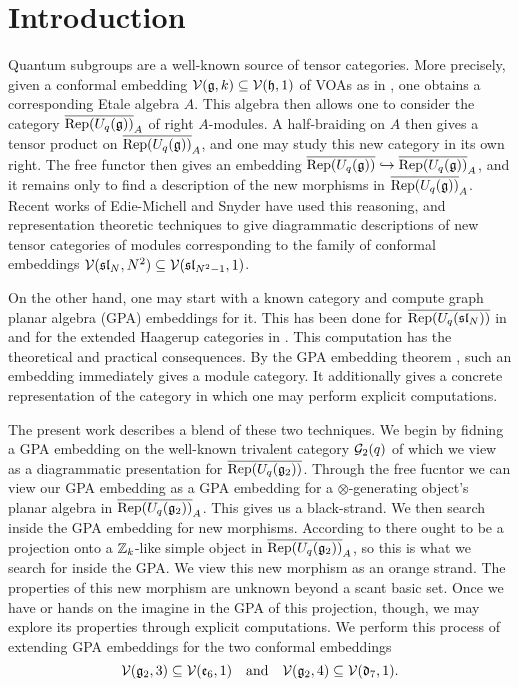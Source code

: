 \section{Introduction}
Quantum subgroups are a well-known source of tensor categories.
More precisely, given a conformal embedding $\mathcal{V}(\mathfrak{g},k) \subseteq \mathcal{V}(\mathfrak{h},1)$ of VOAs 
as in \cite{DMNO}, one obtains a corresponding Etale algebra $A$.
This algebra then allows one to consider the category $\overline{\operatorname{Rep}(U_q(\mathfrak{g}))}_A$ of right $A$-modules.
A half-braiding on $A$ then gives a tensor product on $\overline{\operatorname{Rep}(U_q(\mathfrak{g}))}_A$, and one may study this
new category in its own right.
The free functor then gives an embedding $\overline{\operatorname{Rep}(U_q(\mathfrak{g}))} \hookrightarrow \overline{\operatorname{Rep}(U_q(\mathfrak{g}))}_A$,
and it remains only to find a description of the new morphisms in $\overline{\operatorname{Rep}(U_q(\mathfrak{g}))}_A$.
Recent works of Edie-Michell and Snyder \cite{cain_noah} have used this reasoning, and 
representation theoretic techniques to give diagrammatic descriptions of new tensor categories of modules
corresponding to the family of conformal embeddings $\mathcal{V}(\mathfrak{sl}_N,N^2) \subseteq \mathcal{V}(\mathfrak{sl}_{N^2-1},1)$.

On the other hand, one may start with a known category and compute graph planar algebra (GPA) embeddings for it.
This has been done for $\overline{\operatorname{Rep}(U_q(\mathfrak{sl}_N))}$ in \cite{Cain_Dan} and for the 
extended Haagerup categories in \cite{extended_haagerup}.
This computation has the theoretical and practical consequences.
By the GPA embedding theorem \cite{something}, such an embedding immediately gives a module category.
It additionally gives a concrete representation of the category in which one may perform explicit computations.

The present work describes a blend of these two techniques.
We begin by fidning a GPA embedding on the well-known trivalent category $\mathcal{G}_2(q)$ of \cite{Kuperberg,tricats}
which we view as a diagrammatic presentation for $\overline{\operatorname{Rep}(U_q(\mathfrak{g}_2))}$.
Through the free fucntor we can view our GPA embedding as a GPA embedding for a $\otimes$-generating 
object's planar algebra in $\overline{\operatorname{Rep}(U_q(\mathfrak{g}_2))}_A$.
This gives us a black-strand.
We then search inside the GPA embedding for new morphisms.
According to \cite{DMNO} there ought to be a projection onto a $\mathbb{Z}_k$-like simple object in $\overline{\operatorname{Rep}(U_q(\mathfrak{g}_2))}_A$,
so this is what we search for inside the GPA.
We view this new morphism as an orange strand.
The properties of this new morphism are unknown beyond a scant basic set.
Once we have or hands on the imagine in the GPA of this projection, though, 
we may explore its properties through explicit computations.
We perform this process of extending GPA embeddings for the two conformal embeddings
\begin{equation}\label{eq:conf-embs}
    \mathcal{V}(\mathfrak{g}_2,3) \subseteq \mathcal{V}(\mathfrak{e}_6,1) \quad\text{and}\quad \mathcal{V}(\mathfrak{g}_2,4) \subseteq \mathcal{V}(\mathfrak{d}_7,1).
\end{equation}

